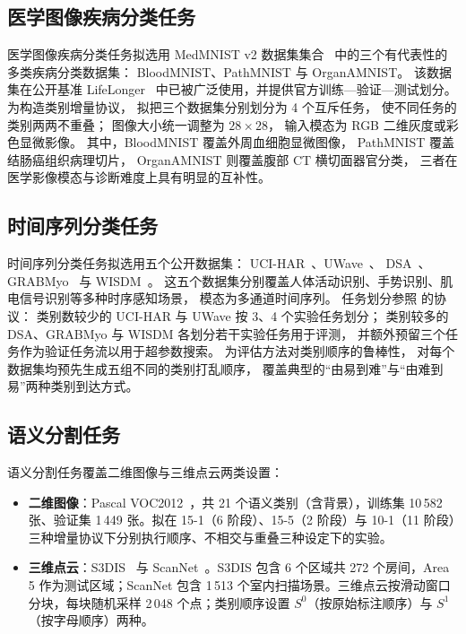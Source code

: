 \subsection{医学图像疾病分类任务}

医学图像疾病分类任务拟选用 MedMNIST v2 数据集集合~\citep{yang2023medmnist}
中的三个有代表性的多类疾病分类数据集：
BloodMNIST、PathMNIST 与 OrganAMNIST。
该数据集在公开基准 LifeLonger~\citep{derakhshani2022lifelonger}
中已被广泛使用，并提供官方训练—验证—测试划分。
为构造类别增量协议，
拟把三个数据集分别划分为 4 个互斥任务，
使不同任务的类别两两不重叠；
图像大小统一调整为 $28\times28$，
输入模态为 RGB 二维灰度或彩色显微影像。
其中，BloodMNIST 覆盖外周血细胞显微图像，
PathMNIST 覆盖结肠癌组织病理切片，
OrganAMNIST 则覆盖腹部 CT 横切面器官分类，
三者在医学影像模态与诊断难度上具有明显的互补性。

\subsection{时间序列分类任务}

时间序列分类任务拟选用五个公开数据集：
UCI-HAR~\citep{ismi2016k}、UWave~\citep{liu2009uwave}、
DSA~\citep{altun2010human}、GRABMyo~\citep{pradhan2022multi}
与 WISDM~\citep{weiss2019wisdm}。
这五个数据集分别覆盖人体活动识别、手势识别、肌电信号识别等多种时序感知场景，
模态为多通道时间序列。
任务划分参照 \citet{qiao2024tscil} 的协议：
类别数较少的 UCI-HAR 与 UWave 按 3、4 个实验任务划分；
类别较多的 DSA、GRABMyo 与 WISDM 各划分若干实验任务用于评测，
并额外预留三个任务作为验证任务流以用于超参数搜索。
为评估方法对类别顺序的鲁棒性，
对每个数据集均预先生成五组不同的类别打乱顺序，
覆盖典型的“由易到难”与“由难到易”两种类别到达方式。

\subsection{语义分割任务}

语义分割任务覆盖二维图像与三维点云两类设置：

\begin{itemize}
    \item \textbf{二维图像}：Pascal VOC2012~\citep{everingham2010voc}，共 21 个语义类别（含背景），训练集 10\,582 张、验证集 1\,449 张。拟在 15-1（6 阶段）、15-5（2 阶段）与 10-1（11 阶段）三种增量协议下分别执行顺序、不相交与重叠三种设定下的实验。
    \item \textbf{三维点云}：S3DIS~\citep{armeni2016s3dis} 与 ScanNet~\citep{dai2017scannet}。S3DIS 包含 6 个区域共 272 个房间，Area 5 作为测试区域；ScanNet 包含 1\,513 个室内扫描场景。三维点云按滑动窗口分块，每块随机采样 2\,048 个点；类别顺序设置 $S^0$（按原始标注顺序）与 $S^1$（按字母顺序）两种。
\end{itemize}

